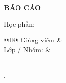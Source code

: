 \begin{titlepage}
\thispagestyle{empty}
\centering
{\bfseries\large \MetaTruong \par}
{\bfseries \MetaKhoa \par}
\vspace{2.5cm}
{\bfseries\Large BÁO CÁO \par}
\vspace{4pt}
{\large \MetaLoai \par}
\vspace{4pt}
{\large Học phần: \MetaMon \par}
\vspace{1.8cm}
{\bfseries\LARGE \MetaDeTai \par}
\vfill
\begin{flushleft}
\hspace*{3cm}\begin{tabular}{@{}ll@{}}
  Giảng viên: & \MetaGV \\
  Lớp / Nhóm: & \MetaNhom \\[4pt]
   \\
  \MetaThanhVien
\end{tabular}
\end{flushleft}
\vspace{1.5cm}
{\MetaNoi, \MetaThoiGian \par}
\end{titlepage}
\clearpage
